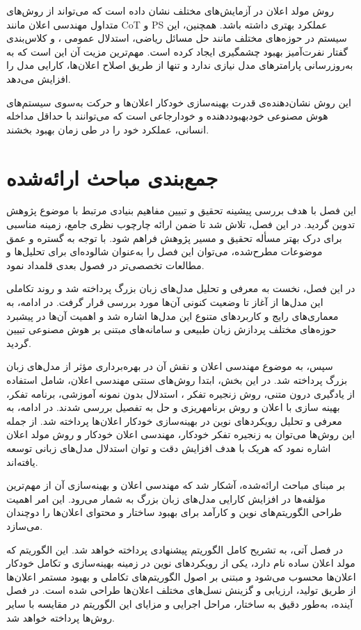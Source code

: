 روش مولد اعلان در آزمایش‌های مختلف نشان داده است که می‌تواند از روش‌های متداول مهندسی اعلان مانند CoT و PS عملکرد بهتری داشته باشد. همچنین، این سیستم در حوزه‌های مختلف مانند حل مسائل ریاضی، استدلال عمومی
، و کلاس‌بندی گفتار نفرت‌آمیز
 بهبود چشمگیری ایجاد کرده است. مهم‌ترین مزیت آن این است که به به‌روزرسانی پارامترهای مدل نیازی ندارد و تنها از طریق اصلاح اعلان‌ها، کارایی مدل را افزایش می‌دهد.  

این روش نشان‌دهنده‌ی قدرت بهینه‌سازی خودکار اعلان‌ها و حرکت به‌سوی سیستم‌های هوش مصنوعی خودبهبوددهنده و خودارجاعی است که می‌توانند با حداقل مداخله انسانی، عملکرد خود را در طی زمان بهبود بخشند.


\section{جمع‌بندی مباحث ارائه‌شده}
این فصل با هدف بررسی پیشینه تحقیق و تبیین مفاهیم بنیادی مرتبط با موضوع پژوهش تدوین گردید. در این فصل، تلاش شد تا ضمن ارائه چارچوب نظری جامع، زمینه مناسبی برای درک بهتر مسأله تحقیق و مسیر پژوهش فراهم شود. با توجه به گستره و عمق موضوعات مطرح‌شده، می‌توان این فصل را به‌عنوان شالوده‌ای برای تحلیل‌ها و مطالعات تخصصی‌تر در فصول بعدی قلمداد نمود.

در این فصل، نخست به معرفی و تحلیل مدل‌های زبان بزرگ پرداخته شد و روند تکاملی این مدل‌ها از آغاز تا وضعیت کنونی آن‌ها مورد بررسی قرار گرفت. در ادامه، به معماری‌های رایج و کاربردهای متنوع این مدل‌ها اشاره شد و اهمیت آن‌ها در پیشبرد حوزه‌های مختلف پردازش زبان طبیعی و سامانه‌های مبتنی بر هوش مصنوعی تبیین گردید.

سپس، به موضوع مهندسی اعلان و نقش آن در بهره‌برداری مؤثر از مدل‌های زبان بزرگ پرداخته شد. در این بخش، ابتدا روش‌های سنتی مهندسی اعلان، شامل استفاده از یادگیری درون متنی، روش زنجیره تفکر ، استدلال بدون نمونه آموزشی، برنامه تفکر، بهینه سازی با اعلان و روش برنامه\/ریزی و حل به تفصیل بررسی شدند. در ادامه، به معرفی و تحلیل رویکردهای نوین در بهینه‌سازی خودکار اعلان‌ها پرداخته شد. از جمله این روش‌ها می‌توان به زنجیره تفکر خودکار، مهندسی اعلان خودکار و روش مولد اعلان اشاره نمود که هریک با هدف افزایش دقت و توان استدلال مدل‌های زبانی توسعه یافته‌اند.


بر مبنای مباحث ارائه‌شده، آشکار شد که مهندسی اعلان و بهینه‌سازی آن از مهم‌ترین مؤلفه‌ها در افزایش کارایی مدل‌های زبان بزرگ به شمار می‌رود. این امر اهمیت طراحی الگوریتم‌های نوین و کارآمد برای بهبود ساختار و محتوای اعلان‌ها را دوچندان می‌سازد.

در فصل آتی، به تشریح کامل الگوریتم پیشنهادی پرداخته خواهد شد. این الگوریتم که مولد اعلان ساده نام دارد، یکی از رویکردهای نوین در زمینه بهینه‌سازی و تکامل خودکار اعلان‌ها محسوب می‌شود و مبتنی بر اصول الگوریتم‌های تکاملی و بهبود مستمر اعلان‌ها از طریق تولید، ارزیابی و گزینش نسل‌های مختلف اعلان‌ها طراحی شده است. در فصل آینده، به‌طور دقیق به ساختار، مراحل اجرایی و مزایای این الگوریتم در مقایسه با سایر روش‌ها پرداخته خواهد شد.
